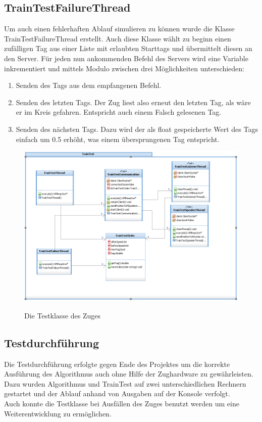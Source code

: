 \subsection{TrainTestFailureThread}

Um auch einen fehlerhaften Ablauf simulieren zu können wurde die Klasse TrainTestFailureThread erstellt. Auch diese Klasse wählt zu beginn einen zufälligen Tag aus einer Liste mit erlaubten Starttags und übermittelt diesen an den Server. Für jeden nun ankommenden Befehl des Servers wird eine Variable inkrementiert und mittels Modulo zwischen drei Möglichkeiten unterschieden:

\begin{enumerate}
	\item Senden des Tags aus dem empfangenen Befehl.
	\item Senden des letzten Tags. Der Zug liest also erneut den letzten Tag, als wäre er im Kreis gefahren. Entspricht auch einem Falsch gelesenen Tag.
	\item Senden des nächsten Tags. Dazu wird der als float gespeicherte Wert des Tags einfach um 0.5 erhöht, was einem übersprungenen Tag entspricht.
\end{enumerate}

\begin{figure}
	\caption{Die Testklasse des Zuges}
	\includegraphics[width=1\textwidth]{content/pictures/train_test/train_test.png}
	\label{pic:train_test}
\end{figure}

\subsection{Testdurchführung}

Die Testdurchführung erfolgte gegen Ende des Projektes um die korrekte Ausführung des Algorithmus auch ohne Hilfe der Zughardware zu gewährleisten. Dazu wurden Algorithmus und TrainTest auf zwei unterschiedlichen Rechnern gestartet und der Ablauf anhand von Ausgaben auf der Konsole verfolgt.\\
Auch konnte die Testklasse bei Ausfällen des Zuges benutzt werden um eine Weiterentwicklung zu ermöglichen.